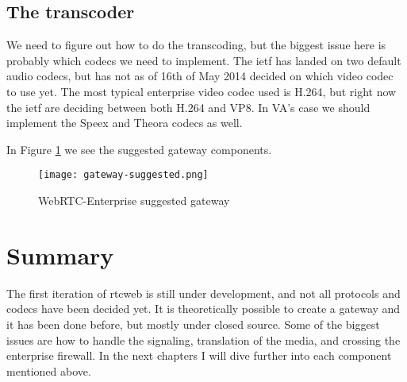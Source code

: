 \subsection{The transcoder}
We need to figure out how to do the transcoding, but the biggest issue here is probably which codecs we need to implement. The \gls{ietf} has landed on two default audio codecs, but has not as of 16th of May 2014 decided on which video codec to use yet. The most typical enterprise video codec used is H.264, but right now the \gls{ietf} are deciding between both H.264 and VP8. In VA's case we should implement the Speex and Theora codecs as well.

In Figure \ref{fig:gateway} we see the suggested gateway components.
\\
\begin{figure}[here]
\centerline{\texttt{[image: gateway-suggested.png]}}
\caption{WebRTC-Enterprise suggested gateway}
\label{fig:gateway}
\end{figure}

\section{Summary}
The first iteration of \gls{rtcweb} is still under development, and not all protocols and codecs have been decided yet. It is theoretically possible to create a gateway and it has been done before, but mostly under closed source. Some of the biggest issues are how to handle the signaling, translation of the media, and crossing the enterprise firewall. In the next chapters I will dive further into each component mentioned above.
